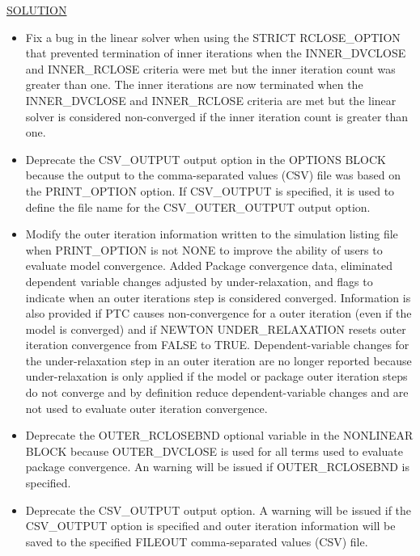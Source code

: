 \begin{itemize}
	\underline{SOLUTION}
	\begin{itemize}
		\item Fix a bug in the linear solver when using the STRICT RCLOSE\_OPTION that prevented termination of inner iterations when the INNER\_DVCLOSE and INNER\_RCLOSE criteria were met but the inner iteration count was greater than one. The inner iterations are now terminated when the INNER\_DVCLOSE and INNER\_RCLOSE criteria are met but the linear solver is considered non-converged if the inner iteration count is greater than one.
		\item Deprecate the CSV\_OUTPUT output option in the OPTIONS BLOCK because the output to the comma-separated values (CSV) file was based on the PRINT\_OPTION option. If CSV\_OUTPUT is specified, it is used to define the file name for the CSV\_OUTER\_OUTPUT output option.
		\item Modify the outer iteration information written to the simulation listing file when PRINT\_OPTION is not NONE to improve the ability of users to evaluate model convergence. Added Package convergence data, eliminated dependent variable changes adjusted by under-relaxation, and flags to indicate when an outer iterations step is considered converged. Information is also provided if PTC causes non-convergence for a outer iteration (even if the model is converged) and if NEWTON UNDER\_RELAXATION resets outer iteration convergence from FALSE to TRUE. Dependent-variable changes for the under-relaxation step in an outer iteration are no longer reported because under-relaxation is only applied if the model or package outer iteration steps do not converge and by definition reduce dependent-variable changes and are not used to evaluate outer iteration convergence.
		\item Deprecate the OUTER\_RCLOSEBND optional variable in the NONLINEAR BLOCK because OUTER\_DVCLOSE is used for all terms used to evaluate package convergence. An warning will be issued if OUTER\_RCLOSEBND is specified.
		\item Deprecate the CSV\_OUTPUT output option. A warning will be issued if the CSV\_OUTPUT option is specified and outer iteration information will be saved to the specified FILEOUT comma-separated values (CSV) file.	
	\end{itemize}

\end{itemize}

